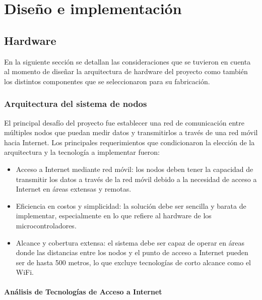 \chapter{Diseño e implementación} %

\label{ChapterDisenoImplementacion} 





\section{Hardware}
En la siguiente sección se detallan las consideraciones que se tuvieron en cuenta al momento de diseñar la arquitectura de hardware del proyecto como también los distintos componentes que se seleccionaron para su fabricación. 

\subsection{Arquitectura del sistema de nodos}
\label{sec:arquitecturahardware}

El principal desafío del proyecto fue establecer una red de comunicación entre múltiples nodos que puedan medir datos y transmitirlos a través de una red móvil hacia Internet. Los principales requerimientos que condicionaron la elección de la arquitectura y la tecnología a implementar fueron:

\begin{itemize}
    \item Acceso a Internet mediante red móvil: los nodos deben tener la capacidad de transmitir los datos a través de la red móvil debido a la necesidad de acceso a Internet en áreas extensas y remotas. 
    \item Eficiencia en costos y simplicidad: la solución debe ser sencilla y barata de implementar, especialmente en lo que refiere al hardware de los microcontroladores.
    \item Alcance y cobertura extensa: el sistema debe ser capaz de operar en áreas donde las distancias entre los nodos y el punto de acceso a Internet pueden ser de hasta 500 metros, lo que excluye tecnologías de corto alcance como el WiFi.
\end{itemize}


\subsubsection{Análisis de Tecnologías de Acceso a Internet}

